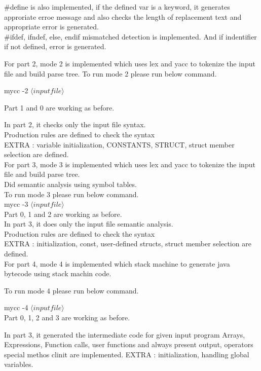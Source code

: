 \documentclass{article}
\begin{document}
$\#$define is also implemented, if the defined var is a keyword, it generates approriate erroe message and also checks the length of replacement text and appropriate error is generated. \\

$\#$ifdef, ifndef, else, endif mismatched detection is implemented.
And if indentifier if not defined,  error is generated.

For part 2,  mode 2 is implemented which uses lex and yacc to tokenize the input file and build parse tree. To run mode 2 please run below command.

mycc -2 $\langle input file\rangle$

Part 1 and 0 are working as before.

In part 2, it checks only the input file syntax.  \\
Production rules are defined to check the syntax \\
EXTRA : variable initialization, CONSTANTS, STRUCT, struct member selection are defined. \\

For part 3,  mode 3 is implemented which uses lex and yacc to tokenize the input file and build parse tree. \\
Did semantic analysis using symbol tables. \\

To run mode 3 please run below command. \\

mycc -3  $\langle input file\rangle$ \\

Part 0, 1 and 2 are working as before. \\

In part 3, it does only the input file semantic analysis. \\
Production rules are defined to check the syntax \\
EXTRA :  initialization, const, user-defined structs, struct member selection are defined. \\

For part 4,  mode 4 is implemented which stack machine to generate java bytecode using stack machin code.

To run mode 4 please run below command.

mycc -4  $\langle input file\rangle$ \\

Part 0, 1, 2 and 3 are working as before.

In part 3, it generated the intermediate code for given input program
Arrays, Expressions, Function calls, user functions and always present output, operators
special methos clinit are implemented.
EXTRA :  initialization, handling global variables.
\end{document}
